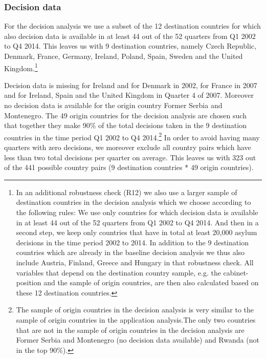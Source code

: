 \documentclass[11pt,a4paper]{scrartcl}
\begin{document}
\subsubsection{Decision data}
For the decision analysis we use a subset of the 12 destination countries for which also decision data is available in at least 44 out of the 52 quarters from Q1 2002 to Q4 2014. This leaves us with 9 destination countries, namely Czech Republic, Denmark, France, Germany, Ireland, Poland, Spain, Sweden and the United Kingdom.\footnote{In an additional robustness check (R12) we also use a larger sample of destination countries in the decision analysis which we choose according to the following rules: We use only countries for which decision data is available in at least 44 out of the 52 quarters from Q1 2002 to Q4 2014. And then in a second step, we keep only countries that have in total at least 20,000 asylum decisions in the time period 2002 to 2014. In addition to the 9 destination countries which are already in the baseline decision analysis we thus also include Austria, Finland, Greece and Hungary in that robustness check. All variables that depend on the destination country sample, e.g. the cabinet-position and the sample of origin countries, are then also calculated based on these 12 destination countries.}

Decision data is missing for Ireland and for Denmark in 2002, for France in 2007 and for Ireland, Spain and the United Kingdom in Quarter 4 of 2007. Moreover no decision data is available for the origin country Former Serbia and Montenegro. The 49 origin countries for the decision analysis are chosen such that together they make 90\% of the total decisions taken in the 9 destination countries in the time period Q1 2002 to Q4 2014.\footnote{The sample of origin countries in the decision analysis is very similar to the sample of origin countries in the application analysis.The only two countries that are not in the sample of origin countries in the decision analysis are Former Serbia and Montenegro (no decision data available) and Rwanda (not in the top 90\%).} In order to avoid having many quarters with zero decisions, we moreover exclude all country pairs which have less than two total decisions per quarter on average. This leaves us with 323 out of the 441 possible country pairs (9 destination countries * 49 origin countries).
\end{document}
